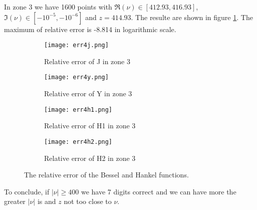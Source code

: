 \documentclass[12pt,a4paper]{article}
\numberwithin{equation}{section}
\theoremstyle{definition}
\theoremstyle{plain}
\theoremstyle{remark}
\begin{document}
\bigskip

In zone 3 we have 1600 points with \( \Re(\nu) \in [412.93,416.93] \), \( \Im(\nu) \in [-10^{-5},-10^{-6}] \) and \( z = 414.93 \).
The resulte are shown in figure \ref{err4}.
The maximum of relative error is -8.814 in logarithmic scale.
\begin{figure}[ht]
    \centering
    \begin{subfigure}[h]{0.45\textwidth}
        \texttt{[image: err4j.png]}
        \caption{Relative error of J in zone 3}
    \end{subfigure}
    \begin{subfigure}[h]{0.45\textwidth}
        \texttt{[image: err4y.png]}
        \caption{Relative error of Y in zone 3}
    \end{subfigure}

    \begin{subfigure}[h]{0.45\textwidth}
        \texttt{[image: err4h1.png]}
        \caption{Relative error of H1 in zone 3}
    \end{subfigure}
    \begin{subfigure}[h]{0.45\textwidth}
        \texttt{[image: err4h2.png]}
        \caption{Relative error of H2 in zone 3}
    \end{subfigure}
    \caption{The relative error of the Bessel and Hankel functions.}
    \label{err4}
\end{figure}

\bigskip

To conclude, if \( |\nu| \ge 400 \) we have 7 digits correct and we can have more the greater \( |\nu| \) is and \( z \) not too close to \( \nu \).



\end{document}
